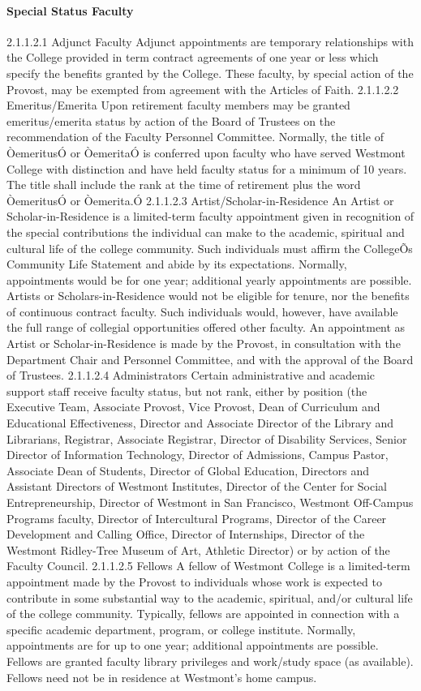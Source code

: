 \documentclass[letterpaper, 11pt]{article}
\begin{document}
			\paragraph{Special Status Faculty}
				2.1.1.2.1 Adjunct Faculty
				Adjunct appointments are temporary relationships with the College provided in term contract agreements of one year or less which specify the benefits granted by the College. These faculty, by special action of the Provost, may be exempted from agreement with the Articles of Faith.
				2.1.1.2.2 Emeritus/Emerita
				Upon retirement faculty members may be granted emeritus/emerita status by action of the Board of Trustees on the recommendation of the Faculty Personnel Committee.  Normally, the title of ÒemeritusÓ or ÒemeritaÓ is conferred upon faculty who have served Westmont College with distinction and have held faculty status for a minimum of 10 years.  The title shall include the rank at the time of retirement plus the word ÒemeritusÓ or Òemerita.Ó
				2.1.1.2.3 Artist/Scholar-in-Residence
				An Artist or Scholar-in-Residence is a limited-term faculty appointment given in recognition of the special contributions the individual can make to the academic, spiritual and cultural life of the college community.  Such individuals must affirm the CollegeÕs Community Life Statement and abide by its expectations.  Normally, appointments would be for one year; additional yearly appointments are possible.  Artists or Scholars-in-Residence would not be eligible for tenure, nor the benefits of continuous contract faculty. Such individuals would, however, have available the full range of collegial opportunities offered other faculty.  An appointment as Artist or Scholar-in-Residence is made by the Provost, in consultation with the Department Chair and Personnel Committee, and with the approval of the Board of Trustees.
				2.1.1.2.4 Administrators
				Certain administrative and academic support staff receive faculty status, but not rank, either by position (the Executive Team, Associate Provost, Vice Provost, Dean of Curriculum and Educational Effectiveness, Director and Associate Director of the Library and Librarians, Registrar, Associate Registrar, Director of Disability Services, Senior Director of Information Technology, Director of Admissions, Campus Pastor, Associate Dean of Students, Director of Global Education, Directors and Assistant Directors of Westmont Institutes, Director of the Center for Social Entrepreneurship, Director of Westmont in San Francisco, Westmont Off-Campus Programs faculty, Director of Intercultural Programs, Director of the Career Development and Calling Office, Director of Internships, Director of the Westmont Ridley-Tree Museum of Art, Athletic Director) or by action of the Faculty Council.
				2.1.1.2.5 Fellows
				A fellow of Westmont College is a limited-term appointment made by the Provost to individuals whose work is expected to contribute in some substantial way to the academic, spiritual, and/or cultural life of the college community.  Typically, fellows are appointed in connection with a specific academic department, program, or college institute.  Normally, appointments are for up to one year; additional appointments are possible.  Fellows are granted faculty library privileges and work/study space (as available).  Fellows need not be in residence at Westmont's home campus.
\end{document}
